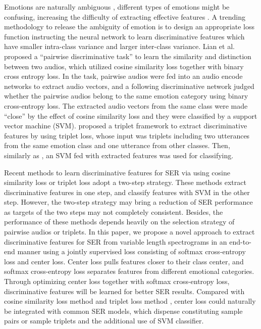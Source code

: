 \documentclass{article}
\begin{document}
Emotions are naturally ambiguous \cite{mower2009interpreting}, different types of emotions might be confusing, increasing the difficulty of extracting effective features \cite{chao2016long}. A trending methodology to release the ambiguity of emotion is to design an appropriate loss function instructing the neural network to learn discriminative features which have smaller intra-class variance and larger inter-class variance. Lian et al. \cite{lian2018pairwise} proposed a ``pairwise discriminative task'' to learn the similarity and distinction between two audios, which utilized cosine similarity loss together with binary cross entropy loss. In the task, pairwise audios were fed into an audio encode networks to extract audio vectors, and a following discriminative network judged whether the pairwise audios belong to the same emotion category using binary cross-entropy loss. The extracted audio vectors from the same class were made ``close'' by the effect of cosine similarity loss and they were classified by a support vector machine ({SVM}). \cite{huang2018speech} proposed a triplet framework to extract discriminative features by using triplet loss\cite{schroff2015facenet}, whose input was triplets including two utterances from the same emotion class and one utterance from other classes. Then, similarly as \cite{lian2018pairwise}, an SVM fed with extracted features was used for classifying.

Recent methods to learn discriminative features for SER via using cosine similarity loss\cite{lian2018pairwise} or triplet loss\cite{huang2018speech} adopt a two-step strategy. These methods extract discriminative features in one step, and classify features with SVM in the other step. However, the two-step strategy may bring a reduction of SER performance as targets of the two steps may not completely consistent. Besides, the performance of these methods depends heavily on the selection strategy of pairwise audios or triplets. In this paper, we propose a novel approach to extract discriminative features for SER from variable length spectrograms in an end-to-end manner using a jointly supervised loss consisting of softmax cross-entropy loss and center loss\cite{wen2016discriminative}. Center loss pulls features closer to their class center, and softmax cross-entropy loss separates features from different emotional categories. Through optimizing center loss together with softmax cross-entropy loss, discriminative features will be learned for better SER results. Compared with cosine similarity loss method \cite{lian2018pairwise} and triplet loss method \cite{huang2018speech}, center loss could naturally be integrated with common SER models, which dispense constituting sample pairs or sample triplets and the additional use of SVM classifier.
\end{document}
